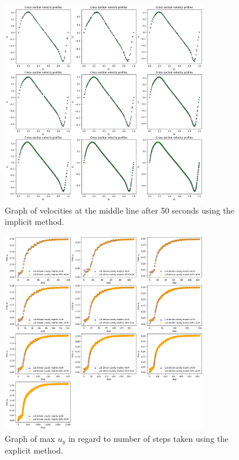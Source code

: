 \documentclass{article}
\begin{document}
\begin{figure}[h!] 
    \centering 
    \includegraphics[width=0.8\textwidth]{lidDriven_cross.png} 
    \caption{Graph of velocities at the middle line after 50 seconds using the implicit method.} 
    \label{fig:lidDriven_cross} 
\end{figure}
\begin{figure}[h!] 
    \centering 
    \includegraphics[width=0.8\textwidth]{lidDrivenACM_convergence.png} 
    \caption{Graph of max $u_y$ in regard to number of steps taken using the explicit method.} 
    \label{fig:lidDrivenACM_convergence} 
\end{figure}
\end{document}
